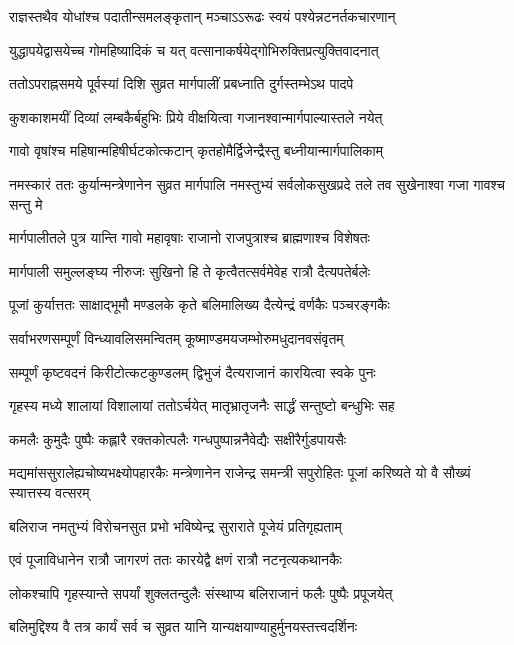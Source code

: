 \twolineshloka
{राज्ञस्तथैव योधांश्च पदातीन्समलङ्कृतान्}
{मञ्चाऽऽरूढः स्वयं पश्येन्नटनर्तकचारणान्} %

\twolineshloka
{युद्धापयेद्वासयेच्च गोमहिष्यादिकं च यत्}
{वत्सानाकर्षयेद्गोभिरुक्तिप्रत्युक्तिवादनात्} %

\twolineshloka
{ततोऽपराह्नसमये पूर्वस्यां दिशि सुव्रत}
{मार्गपालीं प्रबध्नाति दुर्गस्तम्भेऽथ पादपे} %

\twolineshloka
{कुशकाशमयीं दिव्यां लम्बकैर्बहुभिः प्रिये}
{वीक्षयित्वा गजानश्वान्मार्गपाल्यास्तले नयेत्} %

\twolineshloka
{गावो वृषांश्च महिषान्महिषीर्घटकोत्कटान्}
{कृतहोमैर्द्विजेन्द्रैस्तु बध्नीयान्मार्गपालिकाम्} %

\threelineshloka
{नमस्कारं ततः कुर्यान्मन्त्रेणानेन सुव्रत}
{मार्गपालि नमस्तुभ्यं सर्वलोकसुखप्रदे}
{तले तव सुखेनाश्वा गजा गावश्च सन्तु मे} %

\twolineshloka
{मार्गपालीतले पुत्र यान्ति गावो महावृषाः}
{राजानो राजपुत्राश्च ब्राह्मणाश्च विशेषतः} %

\twolineshloka
{मार्गपाली समुल्लङ्घ्य नीरुजः सुखिनो हि ते}
{कृत्वैतत्सर्वमेवेह रात्रौ दैत्यपतेर्बलेः} %

\twolineshloka
{पूजां कुर्यात्ततः साक्षाद्भूमौ मण्डलके कृते}
{बलिमालिख्य दैत्येन्द्रं वर्णकैः पञ्चरङ्गकैः} %

\twolineshloka
{सर्वाभरणसम्पूर्णं विन्ध्यावलिसमन्वितम्}
{कूष्माण्डमयजम्भोरुमधुदानवसंवृतम्} %

\twolineshloka
{सम्पूर्णं कृष्टवदनं किरीटोत्कटकुण्डलम्}
{द्विभुजं दैत्यराजानं कारयित्वा स्वके पुनः} %

\twolineshloka
{गृहस्य मध्ये शालायां विशालायां ततोऽर्चयेत्}
{मातृभ्रातृजनैः सार्द्धं सन्तुष्टो बन्धुभिः सह} %

\twolineshloka
{कमलैः कुमुदैः पुष्पैः कह्लारै रक्तकोत्पलैः}
{गन्धपुष्पान्ननैवेद्यैः सक्षीरैर्गुडपायसैः} %

\threelineshloka
{मद्यमांससुरालेह्यचोष्यभक्ष्योपहारकैः}
{मन्त्रेणानेन राजेन्द्र समन्त्री सपुरोहितः}
{पूजां करिष्यते यो वै सौख्यं स्यात्तस्य वत्सरम्} %

\twolineshloka
{बलिराज नमतुभ्यं विरोचनसुत प्रभो}
{भविष्येन्द्र सुराराते पूजेयं प्रतिगृह्यताम्} %

\twolineshloka
{एवं पूजाविधानेन रात्रौ जागरणं ततः}
{कारयेद्वै क्षणं रात्रौ नटनृत्यकथानकैः} %

\twolineshloka
{लोकश्चापि गृहस्यान्ते सपर्यां शुक्लतन्दुलैः}
{संस्थाप्य बलिराजानं फलैः पुष्पैः प्रपूजयेत्} %

\twolineshloka
{बलिमुद्दिश्य वै तत्र कार्यं सर्व च सुव्रत}
{यानि यान्यक्षयाण्याहुर्मुनयस्तत्त्वदर्शिनः} %

